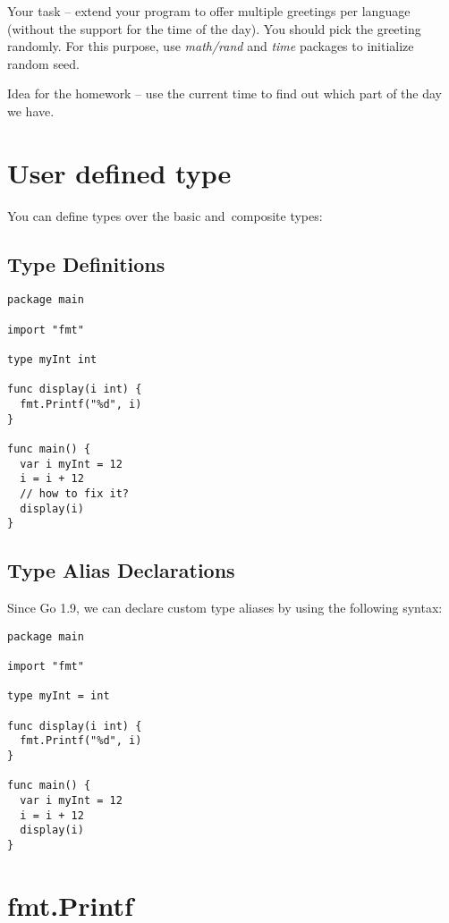\documentclass[11pt, letterpaper]{article}
\begin{document}
\bigskip
Your task -- extend your program to offer multiple greetings per language (without the support for the time of the day). You should pick the greeting randomly. For this purpose, use \emph{math/rand} and \emph{time} packages to initialize random seed.

\bigskip
Idea for the homework -- use the current time to find out which part of the day we have.

\section{User defined type}

You can define types over the basic and~composite types:

\subsection{Type Definitions}

\begin{verbatim}
package main

import "fmt"

type myInt int

func display(i int) {
  fmt.Printf("%d", i)
}

func main() {
  var i myInt = 12
  i = i + 12
  // how to fix it?
  display(i)
}
\end{verbatim}

\subsection{Type Alias Declarations}

Since Go 1.9, we can declare custom type aliases by using the following syntax:

\begin{verbatim}
package main

import "fmt"

type myInt = int

func display(i int) {
  fmt.Printf("%d", i)
}

func main() {
  var i myInt = 12
  i = i + 12
  display(i)
}
\end{verbatim}

\section{fmt.Printf}
\end{document}
